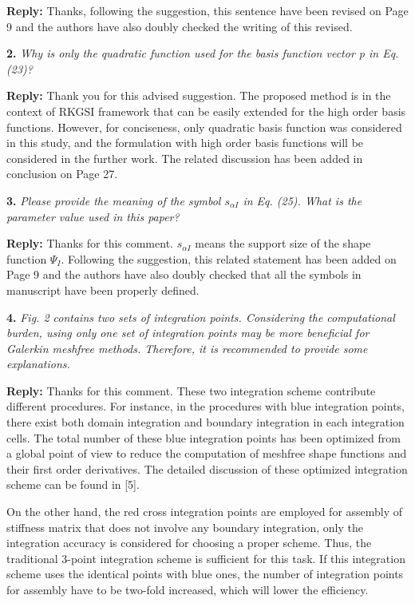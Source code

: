 \documentclass{article}
\begin{document}
\textbf{Reply:} Thanks, following the suggestion, this sentence have been revised on Page 9 and the authors have also doubly checked the writing of this revised.

\textbf{2.} \textit{Why is only the quadratic function used for the basis function vector p in Eq. (23)?}

\textbf{Reply:} Thank you for this advised suggestion. The proposed method is in the context of RKGSI framework that can be easily extended for the high order basis functions. However, for conciseness, only quadratic basis function was considered in this study, and the formulation with high order basis functions will be considered in the further work. The related discussion has been added in conclusion on Page 27.

\textbf{3.} \textit{Please provide the meaning of the symbol $s_{\alpha I}$ in Eq. (25). What is the parameter value used in this paper?}

\textbf{Reply:} Thanks for this comment. $s_{\alpha I}$ means the support size of the shape function $\Psi_I$. Following the suggestion, this related statement has been added on Page 9 and the authors have also doubly checked that all the symbols in manuscript have been properly defined.

\textbf{4.} \textit{Fig. 2 contains two sets of integration points. Considering the computational burden, using only one set of integration points may be more beneficial for Galerkin meshfree methods. Therefore, it is recommended to provide some explanations.}

\textbf{Reply:} Thanks for this comment. These two integration scheme contribute different procedures. For instance, in the procedures with blue integration points, there exist both domain integration and boundary integration in each integration cells. The total number of these blue integration points has been optimized from a global point of view to reduce the computation of meshfree shape functions and their first order derivatives. The detailed discussion of these optimized integration scheme can be found in [5].

On the other hand, the red cross integration points are employed for assembly of stiffness matrix that does not involve any boundary integration, only the integration accuracy is considered for choosing a proper scheme. Thus, the traditional 3-point integration scheme is sufficient for this task. If this integration scheme uses the identical points with blue ones, the number of integration points for assembly have to be two-fold increased, which will lower the efficiency. 
\end{document}

